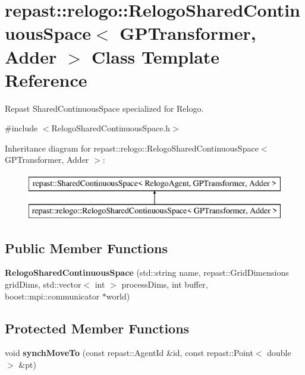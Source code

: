\hypertarget{classrepast_1_1relogo_1_1_relogo_shared_continuous_space}{\section{repast\-:\-:relogo\-:\-:Relogo\-Shared\-Continuous\-Space$<$ G\-P\-Transformer, Adder $>$ Class Template Reference}
\label{classrepast_1_1relogo_1_1_relogo_shared_continuous_space}
}


Repast Shared\-Continuous\-Space specialized for Relogo.  




{\ttfamily \#include $<$Relogo\-Shared\-Continuous\-Space.\-h$>$}

Inheritance diagram for repast\-:\-:relogo\-:\-:Relogo\-Shared\-Continuous\-Space$<$ G\-P\-Transformer, Adder $>$\-:\begin{figure}[H]
\begin{center}
\leavevmode
\includegraphics[height=2.000000cm]{classrepast_1_1relogo_1_1_relogo_shared_continuous_space}
\end{center}
\end{figure}
\subsection*{Public Member Functions}
\begin{DoxyCompactItemize}
\item 
\hypertarget{classrepast_1_1relogo_1_1_relogo_shared_continuous_space_ab7d25f7bcff3c09a10110ef9dfb01bdc}{{\bfseries Relogo\-Shared\-Continuous\-Space} (std\-::string name, repast\-::\-Grid\-Dimensions grid\-Dims, std\-::vector$<$ int $>$ process\-Dims, int buffer, boost\-::mpi\-::communicator $\ast$world)}\label{classrepast_1_1relogo_1_1_relogo_shared_continuous_space_ab7d25f7bcff3c09a10110ef9dfb01bdc}

\end{DoxyCompactItemize}
\subsection*{Protected Member Functions}
\begin{DoxyCompactItemize}
\item 
\hypertarget{classrepast_1_1relogo_1_1_relogo_shared_continuous_space_a0fae00be7a12e9080c9a945f2900f34f}{void {\bfseries synch\-Move\-To} (const repast\-::\-Agent\-Id \&id, const repast\-::\-Point$<$ double $>$ \&pt)}\label{classrepast_1_1relogo_1_1_relogo_shared_continuous_space_a0fae00be7a12e9080c9a945f2900f34f}

\end{DoxyCompactItemize}


